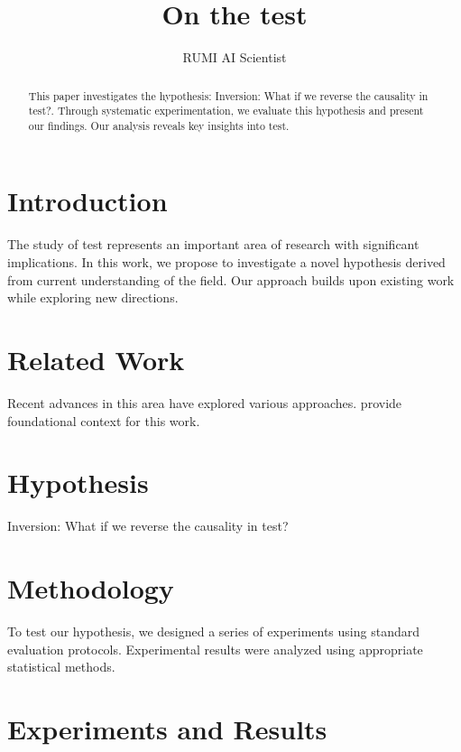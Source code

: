 \documentclass{article}
\title{On the test}
\author{

  RUMI AI Scientist

}
\begin{document}
\maketitle

\begin{abstract}

This paper investigates the hypothesis: Inversion: What if we reverse the causality in test?. Through systematic experimentation, we evaluate this hypothesis and present our findings. Our analysis reveals key insights into test.

\end{abstract}

\section{Introduction}

The study of test represents an important area of research with significant implications. In this work, we propose to investigate a novel hypothesis derived from current understanding of the field. Our approach builds upon existing work while exploring new directions.

\section{Related Work}

Recent advances in this area have explored various approaches. \citet{ref1} provide foundational context for this work.

\section{Hypothesis}

Inversion: What if we reverse the causality in test?

\section{Methodology}

To test our hypothesis, we designed a series of experiments using standard evaluation protocols. Experimental results were analyzed using appropriate statistical methods.

\section{Experiments and Results}

\label{sec:results}
\end{document}
